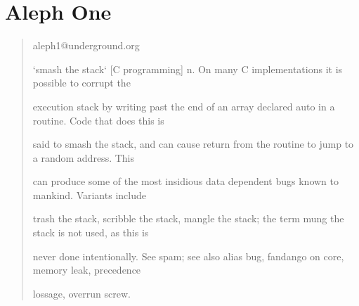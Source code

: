 \documentclass[10pt]{article}
\begin{document}

%

\newpage
\tableofcontents
\newpage

\begin{comment}
.oO Phrack 49 Oo.

Volume Seven, Issue Forty Nine File 14 of 16

BugTraq, r00t, and Underground.Org

 bring you

Smashing The Stack For Fun And Profit
\end{comment}

\section{Aleph One}

\begin{quote}
 aleph1@underground.org

`smash the stack` [C programming] n. On many C implementations it is possible to corrupt the 

execution stack by writing past the end of an array declared auto in a routine. Code that does this is 

said to smash the stack, and can cause return from the routine to jump to a random address. This 

can produce some of the most insidious data dependent bugs known to mankind. Variants include 

trash the stack, scribble the stack, mangle the stack; the term mung the stack is not used, as this is 

never done intentionally. See spam; see also alias bug, fandango on core,  memory leak, precedence 

lossage, overrun screw.
\end{quote}
\end{document}
